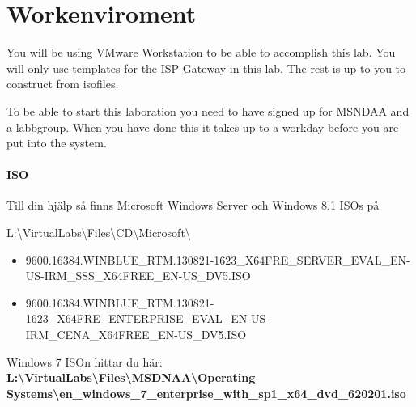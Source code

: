\documentclass[paper=a4, fontsize=11pt]{report} %
\newcommand{\win}[1]{Microsoft Windows Server\ifthenelse{\isempty{#1}}{}{ #1}}
\begin{document}
\section{Workenviroment}
\label{enviroment}

You will be using VMware Workstation to be able to accomplish this lab. You will only use templates for the ISP Gateway in this lab. The rest is up to you to construct from isofiles.
 
To be able to start this laboration you need to have signed up for MSNDAA and a labbgroup. When you have done this it takes up to a workday before you are put into the system.

\paragraph{ISO} Till din hjälp så finns \win{2012 R2} och Windows 8.1 ISOs på 

L:\textbackslash VirtualLabs\textbackslash Files\textbackslash CD\textbackslash Microsoft\textbackslash 
\begin{itemize}
\item 9600.16384.WINBLUE\_RTM.130821-1623\_X64FRE\_SERVER\_EVAL\_EN-US-IRM\_SSS\_X64FREE\_EN-US\_DV5.ISO
\item 9600.16384.WINBLUE\_RTM.130821-1623\_X64FRE\_ENTERPRISE\_EVAL\_EN-US-IRM\_CENA\_X64FREE\_EN-US\_DV5.ISO
\end{itemize}
Windows 7 ISOn hittar du här: \textbf{L:\textbackslash VirtualLabs\textbackslash Files\textbackslash MSDNAA\textbackslash Operating Systems\textbackslash en\_windows\_7\_enterprise\_with\_sp1\_x64\_dvd\_620201.iso
}
\end{document}
